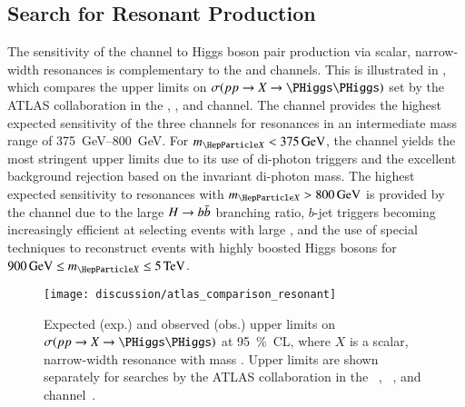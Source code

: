 

\subsection{Search for Resonant \HH Production}

The sensitivity of the \bbtautau channel to Higgs boson pair production via
scalar, narrow-width resonances is complementary to the \bbyy and \bbbb
channels. This is illustrated in , which compares
the upper limits on $\sigma(\pp \to X \to \HH)$ set by the ATLAS collaboration
in the \bbbb, \bbyy, and \bbtautau channel. The \bbtautau channel provides the
highest expected sensitivity of the three channels for resonances in an
intermediate mass range of \SIrange{375}{800}{\GeV}. For $\mX < \SI{375}{\GeV}$,
the \bbyy channel yields the most stringent upper limits due to its use of
di-photon triggers and the excellent background rejection based on the invariant
di-photon mass.
The highest expected sensitivity to resonances with $\mX > \SI{800}{\GeV}$ is
provided by the \bbbb channel due to the large $H \to b\bar{b}$ branching ratio,
$b$-jet triggers becoming increasingly efficient at selecting events with large
\mHH, and the use of special techniques to reconstruct events with highly
boosted Higgs bosons for $\SI{900}{\GeV} \leq \mX \leq \SI{5}{\TeV}$.

\begin{figure}[htbp]
  \centering

  \texttt{[image: discussion/atlas\_comparison\_resonant]}

  \caption{Expected (exp.) and observed (obs.) upper limits on
    $\sigma(\pp \to X \to \HH)$ at \SI{95}{\percent}~CL, where $X$ is a scalar,
    narrow-width resonance with mass \mX. Upper limits are shown separately for
    searches by the ATLAS collaboration in the
    \bbbb~\cite{HDBS-2018-41,hepdata.111124},
    \bbyy~\cite{HDBS-2018-34,hepdata.105864}, and \bbtautau
    channel~\cite{HDBS-2018-40}.}%
  \label{fig:resonant_hh_limits}
\end{figure}

